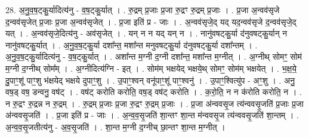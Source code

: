 \documentclass[17pt]{extarticle}
\begin{document}
28. अ॒नु॒व॒ष॒ट्कु॒र्यादित्य॑नु - व॒ष॒ट्कु॒र्यात् । . रु॒द्रम् प्र॒जाः प्र॒जा रु॒द्रꣳ रु॒द्रम् प्र॒जाः । . प्र॒जा अ॒न्वव॑सृजे द॒न्वव॑सृजेत् प्र॒जाः प्र॒जा अ॒न्वव॑सृजेत् । . प्र॒जा इति॑ प्र - जाः । . अ॒न्वव॑सृजे॒द् यद् यद॒न्वव॑सृजे द॒न्वव॑सृजे॒द् यत् । . अ॒न्वव॑सृजे॒दित्य॑नु - अव॑सृजेत् । . यन् न न यद् यन् न । . नानु॑वषट्कु॒र्या द॑नुवषट्कु॒र्यान् न नानु॑वषट्कु॒र्यात् । . अ॒नु॒व॒ष॒ट्कु॒र्या दशा᳚न्त॒ मशा᳚न्त मनुवषट्कु॒र्या द॑नुवषट्कु॒र्या दशा᳚न्तम् । . अ॒नु॒व॒ष॒ट्कु॒र्यादित्य॑नु - व॒ष॒ट्कु॒र्यात् । . अशा᳚न्त म॒ग्नी द॒ग्नी दशा᳚न्त॒ मशा᳚न्त म॒ग्नीत् । . अ॒ग्नीथ् सोमꣳ॒॒ सोम॑ म॒ग्नी द॒ग्नीथ् सोम᳚म् । . अ॒ग्नीदित्य॑ग्नि - इत् । . सोम॑म् भक्षयेद् भक्षये॒थ् सोमꣳ॒॒ सोम॑म् भक्षयेत् । . भ॒क्ष॒ये॒ दु॒पाꣳ॒॒शू॑ पाꣳ॒॒शु भ॑क्षयेद् भक्षये दुपाꣳ॒॒शु । . उ॒पाꣳ॒॒श्वन् वनू॑पाꣳ॒॒शू॑ पाꣳ॒॒श्वनु॑ । . उ॒पाꣳ॒॒श्वित्यु॑प - अꣳ॒॒शु । . अनु॒ वष॒ड् वष॒ डन्वनु॒ वष॑ट् । . वष॑ट् करोति करोति॒ वष॒ड् वष॑ट् करोति । . क॒रो॒ति॒ न न क॑रोति करोति॒ न । . न रु॒द्रꣳ रु॒द्रन्न न रु॒द्रम् । . रु॒द्रम् प्र॒जाः प्र॒जा रु॒द्रꣳ रु॒द्रम् प्र॒जाः । . प्र॒जा अ॑न्ववसृ॒ज त्य॑न्ववसृ॒जति॑ प्र॒जाः प्र॒जा अ॑न्ववसृ॒जति॑ । . प्र॒जा इति॑ प्र - जाः । . अ॒न्व॒व॒सृ॒जति॑ शा॒न्तꣳ शा॒न्त म॑न्ववसृ॒ज त्य॑न्ववसृ॒जति॑ शा॒न्तम् । . अ॒न्व॒व॒सृ॒जतीत्य॑नु - अ॒व॒सृ॒जति॑ । . शा॒न्त म॒ग्नी द॒ग्नीच् छा॒न्तꣳ शा॒न्त म॒ग्नीत् । \newline
\end{document}
